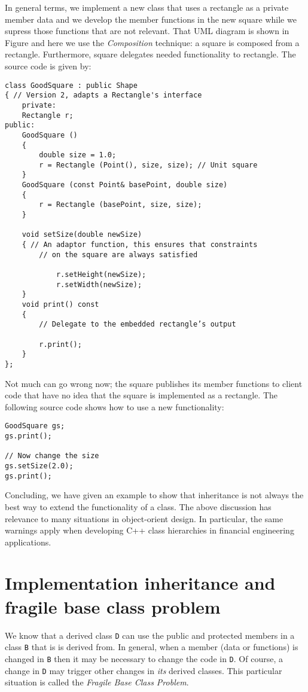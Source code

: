 In general terms, we implement a new class that uses a rectangle as a private member data and we develop the member functions in the new square while we supress those functions that are not relevant. That UML diagram is shown in Figure %
and here we use the \emph{Composition} technique: a square is composed from a rectangle. Furthermore, square delegates needed functionality to rectangle. The source code is given by:
\begin{lstlisting}
class GoodSquare : public Shape
{ // Version 2, adapts a Rectangle's interface
	private:
	Rectangle r;
public:
	GoodSquare ()
	{
		double size = 1.0;
		r = Rectangle (Point(), size, size); // Unit square
	}
	GoodSquare (const Point& basePoint, double size)
	{
		r = Rectangle (basePoint, size, size);
	}

	void setSize(double newSize)
	{ // An adaptor function, this ensures that constraints
		// on the square are always satisfied

			r.setHeight(newSize);
			r.setWidth(newSize);
	}
	void print() const
	{
		// Delegate to the embedded rectangle’s output

		r.print();
	}
};
\end{lstlisting}
Not much can go wrong now; the square publishes its member functions to client code that have no idea that the square is implemented as a rectangle. The following source code shows how to use a new functionality:
\begin{lstlisting}
GoodSquare gs;
gs.print();

// Now change the size
gs.setSize(2.0);
gs.print();
\end{lstlisting}
Concluding, we have given an example to show that inheritance is not always the best way to extend the functionality of a class. The above discussion has relevance to many situations in object-orient design. In particular, the same warnings apply when developing C++ class hierarchies in financial engineering applications.

\section{Implementation inheritance and fragile base class problem}
We know that a derived class \texttt{D} can use the public and protected members in a class \texttt{B} that is is derived from. In general, when a member (data or functions) is changed in \texttt{B} then it may be necessary to change the code in \texttt{D}. Of course, a change in \texttt{D} may trigger other changes in \emph{its} derived classes. This particular situation is called the \emph{Fragile Base Class Problem}.

